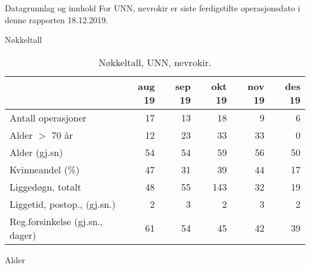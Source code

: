 \documentclass[handout, xcolor=pdftex,dvipsnames,table]{beamer}\usepackage[]{graphicx}\usepackage[]{color}
\begin{document}
\begin{tiny}
\begin{frame}[fragile] {Datagrunnlag og innhold}
For UNN, nevrokir er siste ferdigstilte operasjonsdato i denne rapporten
18.12.2019.

\end{frame}



\begin{frame}[fragile] {Nøkkeltall}


\begin{table}[ht]
\centering
\begin{tabular}{lrrrrr}
  \hline
 & aug 19 & sep 19 & okt 19 & nov 19 & des 19 \\ 
  \hline
Antall operasjoner & 17 & 13 & 18 & 9 & 6 \\ 
  Alder $>$ 70 år & 12 & 23 & 33 & 33 & 0 \\ 
  Alder (gj.sn) & 54 & 54 & 59 & 56 & 50 \\ 
  Kvinneandel (\%) & 47 & 31 & 39 & 44 & 17 \\ 
  Liggedøgn, totalt & 48 & 55 & 143 & 32 & 19 \\ 
  Liggetid, postop., (gj.sn.) & 2 & 3 & 2 & 3 & 2 \\ 
  Reg.forsinkelse (gj.sn., dager) & 61 & 54 & 45 & 42 & 39 \\ 
   \hline
\end{tabular}
\caption{Nøkkeltall, UNN, nevrokir.} 
\label{tab:RegEget}
\end{table}


\end{frame}



\begin{frame}[fragile] {Alder}


\end{frame}
\end{tiny}
\end{document}
